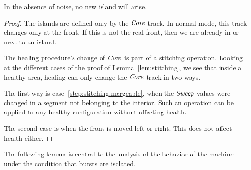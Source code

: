 \documentclass[11pt]{memoir}
\theoremstyle{definition} %
\newcommand{\fld}[1]{\ensuremath{\textit{#1\/}}}
\newcommand{\Core}{\fld{Core}}
\newcommand{\Sweep}{\fld{Sweep}}
\begin{document}
\begin{lemma}
In the absence of noise, no new island will arise.
\end{lemma}
\begin{proof}
The islands are defined only by the \( \Core \) track.
In normal mode, this track changes only at the front.
If this is not the real front, then we are already in or next to an island.

The healing procedure's change of \( \Core \) is part of a stitching operation.
Looking at the different cases of the proof of Lemma~\ref{lem:stitching}, we see that 
inside a healthy area, healing can only change the \( \Core \) track in two ways.

The first way is case~\ref{step:stitching.mergeable}, when the \( \Sweep \) values were changed
in a segment not belonging to the interior.
Such an operation can be applied to any healthy configuration without affecting health.

The second case is when the front is moved left or right.
This does not affect health either.
\end{proof}

The following lemma is central to the analysis of the behavior of the machine under the condition that 
bursts are isolated.
\end{document}
